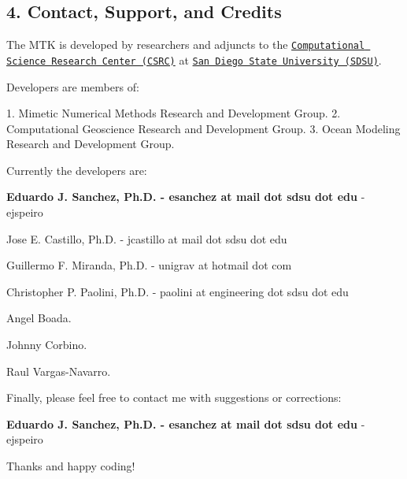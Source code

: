 \begin{DoxyPre}\subsection*{4. Contact, Support, and Credits}\end{DoxyPre}



\begin{DoxyPre}\end{DoxyPre}



\begin{DoxyPre}The MTK is developed by researchers and adjuncts to the
\href{http://www.csrc.sdsu.edu/}{\tt Computational Science Research Center (CSRC)}
at \href{http://www.sdsu.edu/}{\tt San Diego State University (SDSU)}.\end{DoxyPre}



\begin{DoxyPre}Developers are members of:\end{DoxyPre}



\begin{DoxyPre}1. Mimetic Numerical Methods Research and Development Group.
2. Computational Geoscience Research and Development Group.
3. Ocean Modeling Research and Development Group.\end{DoxyPre}



\begin{DoxyPre}Currently the developers are:\end{DoxyPre}



\begin{DoxyPre}
\begin{DoxyEnumerate}
\item {\bfseries Eduardo J. Sanchez, Ph.D. - esanchez at mail dot sdsu dot edu} - ejspeiro
\item Jose E. Castillo, Ph.D. - jcastillo at mail dot sdsu dot edu
\item Guillermo F. Miranda, Ph.D. - unigrav at hotmail dot com
\item Christopher P. Paolini, Ph.D. - paolini at engineering dot sdsu dot edu
\item Angel Boada.
\item Johnny Corbino.
\item Raul Vargas-Navarro.
\end{DoxyEnumerate}\end{DoxyPre}



\begin{DoxyPre}Finally, please feel free to contact me with suggestions or corrections:\end{DoxyPre}



\begin{DoxyPre}{\bfseries Eduardo J. Sanchez, Ph.D. - esanchez at mail dot sdsu dot edu} - ejspeiro\end{DoxyPre}



\begin{DoxyPre}Thanks and happy coding!
\end{DoxyPre}
 
